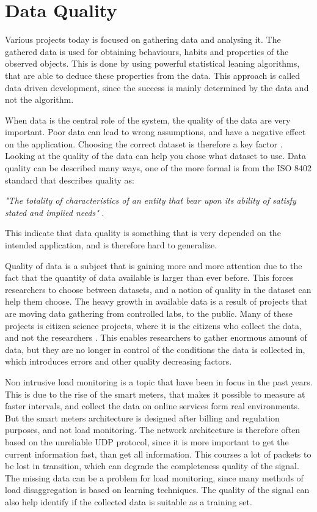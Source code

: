 \chapter{Data Quality}
\label{Sec:DataQuality}
Various projects today is focused on gathering data and analysing it. The gathered data is used for obtaining behaviours, habits and properties of the observed objects. This is done by using powerful statistical leaning algorithms, that are able to deduce these properties from the data. This approach is called data driven development, since the success is mainly determined by the data and not the algorithm. 

When data is the central role of the system, the quality of the data are very important. Poor data can lead to wrong assumptions, and have a negative effect on the application. Choosing the correct dataset is therefore a key factor \cite{RefWorks:3}. Looking at the quality of the data can help you chose what dataset to use. Data quality can be described many ways, one of the more formal is from the ISO 8402 standard that describes quality as: 

\begin{adjustwidth}{2.5em}{2.5em}
\emph{"The totality of characteristics of an entity that bear upon its ability of satisfy stated and implied needs"} \cite{RefWorks:5}.
\end{adjustwidth}

This indicate that data quality is something that is very depended on the intended application, and is therefore hard to generalize. 

Quality of data is a subject that is gaining more and more attention due to the fact that the quantity of data available is larger than ever before. This forces researchers to choose between datasets, and a notion of quality in the dataset can help them choose. The heavy growth in available data is a result of projects that are moving data gathering from controlled labs, to the public. Many of these projects is citizen science projects, where it is the citizens who collect the data, and not the researchers \cite{RefWorks:2}. This enables researchers to gather enormous amount of data, but they are no longer in control of the conditions the data is collected in, which introduces errors and other quality decreasing factors. 

Non intrusive load monitoring is a topic that have been in focus in the past years. This is due to the rise of the smart meters, that makes it possible to measure at faster intervals, and collect the data on online services form real environments. But the smart meters architecture is designed after billing and regulation purposes, and not load monitoring. The network architecture is therefore often based on the unreliable UDP protocol, since it is more important to get the current information fast, than get all information. This courses a lot of packets to be lost in transition, which can degrade the completeness quality of the signal. The missing data can be a problem for load monitoring, since many methods of load disaggregation is based on learning techniques. The quality of the signal can also help identify if the collected data is suitable as a training set. 


